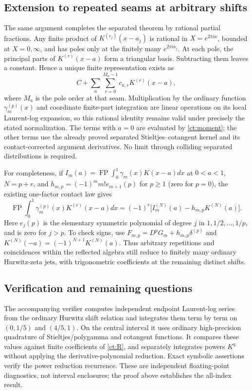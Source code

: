 \documentclass[11pt,a4paper]{article}
\numberwithin{equation}{section}
\theoremstyle{definition}
\theoremstyle{remark}
\begin{document}
\subsection{Extension to repeated seams at arbitrary shifts}

The same argument completes the separated theorem by rational partial
fractions. Any finite product of $K^{(r_j)}(x-a_j)$ is rational in
$X=e^{2\pi ix}$, bounded at $X=0,\infty$, and has poles only at the
finitely many $e^{2\pi ia_j}$. At each pole, the principal parts of
$K^{(r)}(x-a)$ form a triangular basis. Subtracting them leaves a
constant. Hence a unique finite representation exists as
\[
 C+\sum_a\sum_{r=0}^{M_a-1}c_{a,r}K^{(r)}(x-a),
\]
where $M_a$ is the pole order at that seam. Multiplication by the ordinary
function $\gamma_m^{(p)}(x)$ and coordinate finite-part integration are
linear operations on its local Laurent-log expansion, so this rational
identity remains valid under precisely the stated normalization. The
terms with $a=0$ are evaluated by \eqref{ct:moment}; the other terms use
the already proved separated Stieltjes--cotangent kernel and its
contact-corrected argument derivatives. No limit through colliding
separated distributions is required.

For completeness, if
$I_m(a)=\operatorname{FP}\int_0^1\gamma_m(x)K(x-a)dx$ at $0<a<1$,
$N=p+r$, and
$h_{m,p}=(-1)^m m!e_{m+1}(p)$ for $p\ge1$ (zero for $p=0$),
the existing one-factor contact law \cite{RepoMain,RepoTriple} gives
\[
 \operatorname{FP}\int_0^1\gamma_m^{(p)}(x)K^{(r)}(x-a)dx
       =(-1)^r\bigl[I_m^{(N)}(a)-h_{m,p}K^{(N)}(a)\bigr].
\]
Here $e_j(p)$ is the elementary symmetric polynomial of degree $j$ in
$1,1/2,\ldots,1/p$, and is zero for $j>p$. To check signs, use
$F_{m,p}=D^pG_m+h_{m,p}\delta^{(p)}$ and
$K^{(N)}(-a)=(-1)^{N+1}K^{(N)}(a)$. Thus arbitrary repetitions and
coincidences within the reflected algebra still reduce to finitely many
ordinary Hurwitz-zeta jets, with trigonometric coefficients at the
remaining distinct shifts.

\subsection{Verification and remaining questions}

The accompanying verifier computes independent endpoint Laurent-log
series from the ordinary Hurwitz shift relation and integrates them
term by term on $(0,1/5)$ and $(4/5,1)$. On the central interval it uses
ordinary high-precision quadrature of Stieltjes/polygamma and cotangent
functions. It compares these values against finite coefficients of
\eqref{ct:R}, and separately integrates powers $K^q$ without applying
the derivative-polynomial reduction. Exact symbolic assertions verify
the power reduction recurrence. These are independent floating-point
diagnostics, not interval enclosures; the proof above establishes the
all-index result.
\end{document}
